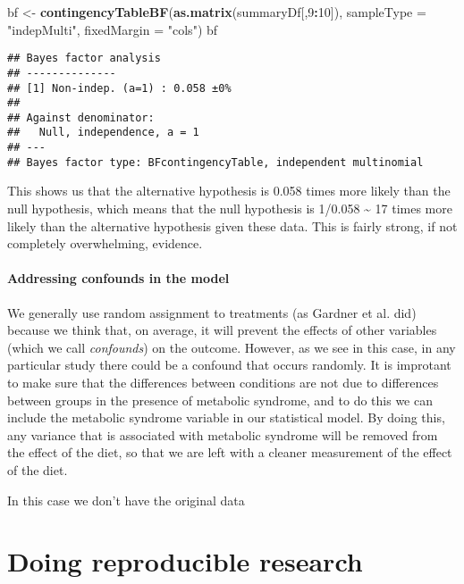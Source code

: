 \documentclass[]{book}
\newenvironment{Shaded}{\begin{snugshade}}{\end{snugshade}}
\newcommand{\KeywordTok}[1]{\textcolor[rgb]{0.13,0.29,0.53}{\textbf{#1}}}
\newcommand{\DataTypeTok}[1]{\textcolor[rgb]{0.13,0.29,0.53}{#1}}
\newcommand{\DecValTok}[1]{\textcolor[rgb]{0.00,0.00,0.81}{#1}}
\newcommand{\StringTok}[1]{\textcolor[rgb]{0.31,0.60,0.02}{#1}}
\newcommand{\OperatorTok}[1]{\textcolor[rgb]{0.81,0.36,0.00}{\textbf{#1}}}
\newcommand{\NormalTok}[1]{#1}
\theoremstyle{definition}
\theoremstyle{definition}
\theoremstyle{definition}
\theoremstyle{remark}
\begin{document}
\begin{Shaded}
\begin{Highlighting}[]
\NormalTok{bf <-}\StringTok{ }\KeywordTok{contingencyTableBF}\NormalTok{(}\KeywordTok{as.matrix}\NormalTok{(summaryDf[,}\DecValTok{9}\OperatorTok{:}\DecValTok{10}\NormalTok{]), }
                         \DataTypeTok{sampleType =} \StringTok{"indepMulti"}\NormalTok{, }
                         \DataTypeTok{fixedMargin =} \StringTok{"cols"}\NormalTok{)}
\NormalTok{bf}
\end{Highlighting}
\end{Shaded}

\begin{verbatim}
## Bayes factor analysis
## --------------
## [1] Non-indep. (a=1) : 0.058 ±0%
## 
## Against denominator:
##   Null, independence, a = 1 
## ---
## Bayes factor type: BFcontingencyTable, independent multinomial
\end{verbatim}

This shows us that the alternative hypothesis is 0.058 times more likely
than the null hypothesis, which means that the null hypothesis is
1/0.058 \textasciitilde{} 17 times more likely than the alternative
hypothesis given these data. This is fairly strong, if not completely
overwhelming, evidence.

\subsubsection{Addressing confounds in the
model}\label{addressing-confounds-in-the-model}

We generally use random assignment to treatments (as Gardner et al. did)
because we think that, on average, it will prevent the effects of other
variables (which we call \emph{confounds}) on the outcome. However, as
we see in this case, in any particular study there could be a confound
that occurs randomly. It is improtant to make sure that the differences
between conditions are not due to differences between groups in the
presence of metabolic syndrome, and to do this we can include the
metabolic syndrome variable in our statistical model. By doing this, any
variance that is associated with metabolic syndrome will be removed from
the effect of the diet, so that we are left with a cleaner measurement
of the effect of the diet.

In this case we don't have the original data

\chapter{Doing reproducible research}\label{doing-reproducible-research}
\end{document}
